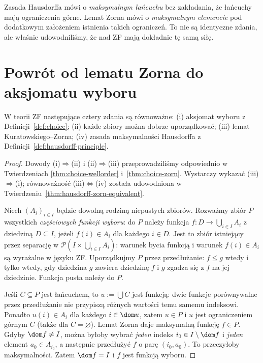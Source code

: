 \begin{uwaga}
Zasada Hausdorffa mówi o \emph{maksymalnym łańcuchu}
bez zakładania, że łańcuchy mają ograniczenia górne.
Lemat Zorna mówi o \emph{maksymalnym elemencie}
pod dodatkowym założeniem istnienia takich ograniczeń.
To nie są identyczne zdania, ale właśnie udowodniliśmy,
że nad ZF mają dokładnie tę samą siłę.
\end{uwaga}

\section{Powrót od lematu Zorna do aksjomatu wyboru}
\begin{twierdzenie}\label{thm:choice-equivalence}
W teorii ZF następujące cztery zdania są równoważne:
(i) aksjomat wyboru z Definicji~\ref{def:choice};
(ii) każde zbiory można dobrze uporządkować;
(iii) lemat Kuratowskiego--Zorna;
(iv) zasada maksymalności Hausdorffa z Definicji~\ref{def:hausdorff-principle}.
\end{twierdzenie}
\begin{proof}
Dowody (i)$\Rightarrow$(ii) i (ii)$\Rightarrow$(iii)
przeprowadziliśmy odpowiednio w Twierdzeniach
\ref{thm:choice-wellorder} i~\ref{thm:choice-zorn}.
Wystarczy wykazać (iii)$\Rightarrow$(i);
równoważność (iii)$\Leftrightarrow$(iv) została udowodniona
w Twierdzeniu~\ref{thm:hausdorff-zorn-equivalent}.

Niech $(A_i)_{i\in I}$ będzie dowolną rodziną niepustych
zbiorów. Rozważmy zbiór $P$ wszystkich \emph{częściowych
funkcji wyboru}: do $P$ należy funkcja $f:D\to\bigcup_{i\in I}A_i$
z dziedziną $D\subseteq I$, jeżeli $f(i)\in A_i$
dla każdego $i\in D$. Jest to zbiór istniejący przez
separację w $\mathcal P(I\times\bigcup_{i\in I}A_i)$:
warunek bycia funkcją i warunek $f(i)\in A_i$
są wyrażalne w języku ZF.
Uporządkujmy $P$ przez
przedłużanie: $f\le g$ wtedy i tylko wtedy, gdy
dziedzina $g$ zawiera dziedzinę $f$ i $g$ zgadza się
z $f$ na jej dziedzinie. Funkcja pusta należy do $P$.

Jeśli $C\subseteq P$ jest łańcuchem, to $u:=\bigcup C$
jest funkcją: dwie funkcje porównywalne przez
przedłużanie nie przypiszą różnych wartości temu samemu
indeksowi. Ponadto $u(i)\in A_i$ dla każdego
$i\in\dom u$, zatem $u\in P$ i $u$ jest
ograniczeniem górnym $C$ (także dla $C=\varnothing$).
Lemat Zorna daje maksymalną funkcję $f\in P$.
Gdyby $\dom f\ne I$, można byłoby wybrać \emph{jeden}
indeks $i_0\in I\setminus\dom f$ i \emph{jeden}
element $a_0\in A_{i_0}$, a następnie przedłużyć
$f$ o parę $(i_0,a_0)$. To przeczyłoby maksymalności.
Zatem $\dom f=I$ i $f$ jest funkcją wyboru.
\end{proof}

